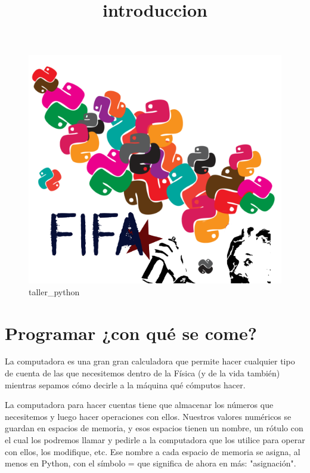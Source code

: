 \documentclass[11pt]{article}
\title{introduccion}
\makeatletter
\def\maxwidth{\ifdim\Gin@nat@width>\linewidth\linewidth
    \else\Gin@nat@width\fi}
\let\Oldincludegraphics\includegraphics
\renewcommand{\includegraphics}[1]{\Oldincludegraphics[width=.8\maxwidth]{#1}}
\makeatother
\begin{document}
    
    
    \maketitle
    
    

    
    \begin{figure}
\centering
\includegraphics{logos_python_fifa.png}
\caption{taller\_python}
\end{figure}

    \section{Programar ¿con qué se
come?}\label{programar-con-quuxe9-se-come}

    La computadora es una gran gran calculadora que permite hacer cualquier
tipo de cuenta de las que necesitemos dentro de la Física (y de la vida
también) mientras sepamos cómo decirle a la máquina qué cómputos hacer.

La computadora para hacer cuentas tiene que almacenar los números que
necesitemos y luego hacer operaciones con ellos. Nuestros valores
numéricos se guardan en espacios de memoria, y esos espacios tienen un
nombre, un rótulo con el cual los podremos llamar y pedirle a la
computadora que los utilice para operar con ellos, los modifique, etc.
Ese nombre a cada espacio de memoria se asigna, al menos en Python, con
el símbolo = que significa de ahora en más: "asignación".
\end{document}
